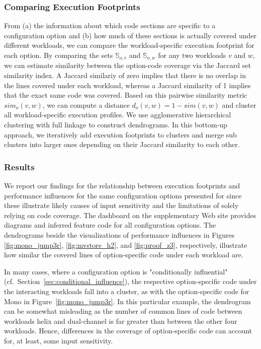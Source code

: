 {{{\subsubsection{Comparing Execution Footprints}
From (a) the information about which code sections are specific to a configuration option and (b) how much of these sections is actually covered under different workloads, we can compare the workload-specific execution footprint for each option. By comparing the sets $\mathbb{S}_{o, v}$ and $\mathbb{S}_{o, w}$ for any two workloads $v$ and $w$, we can estimate similarity between the option-code coverage via the Jaccard set similarity index. A Jaccard similariy of zero implies that there is no overlap in the lines covered under each workload, whereas a Jaccard similarity of 1 implies that the exact same code was covered. Based on this pairwise similarity metric $sim_o(v, w)$, we can compute a distance $d_o(v, w) = 1 - sim(v, w)$ and cluster all workload-specific execution profiles. 
We use agglomerative hierarchical clustering with full linkage to construct dendrograms. In this bottom-up approach, we iteratively add execution footprints to clusters and merge sub clusters into larger ones depending on their Jaccard similarity  to each other. 

\subsubsection{Results}\label{sec:results3}
We report our findings for the relationship between execution footprints and performance influences for the same configuration options presented for  since these illustrate likely causes of input sensitivity and the limitations of solely relying on code coverage. The dashboard on the supplementary Web site provides diagrams and inferred feature code for all configuration options. The dendrograms beside the visualizations of performance influences in Figures \ref{fig:mono_jump3r}, \ref{fig:mvstore_h2}, and \ref{fig:proof_z3}, respectively, illustrate how similar the covered lines of option-specific code under each workload are. 

In many cases, where  a configuration option is "conditionally influential" (cf.~Section~\ref{sec:conditional_influence}), the respective option-specific code under the interacting workloads fall into a cluster, as with the option-specific code for \textsf{Mono} in Figure~\ref{fig:mono_jump3r}. In this particular example, the dendrogram can be somewhat misleading as the number of common lines of code between workloads helix and dual-channel is far greater than between the other four workloads. Hence, differences in the coverage of option-specific code can account for, at least, some input sensitivity.

}}}

